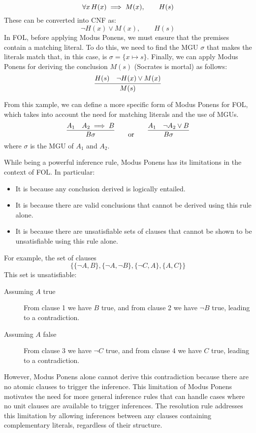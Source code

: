 \begin{equation}
  \forall x \, H(x) \implies M(x), \qquad H(s)
\end{equation}
These can be converted into CNF as:
\begin{equation}
    \neg H(x) \lor M(x), \qquad H(s)
\end{equation}
In FOL, before applying Modus Ponens, we must ensure that the premises contain a matching literal. To do this, we need to find the MGU \(\sigma\) that makes the literals match that, in this case, is \(\sigma = \{x\mapsto s\}\).
Finally, we can apply Modus Ponens for deriving the conclusion \(M(s)\) (Socrates is mortal) as follows:
\begin{equation}
  \infer{M(s)}{H(s) & \neg H(x) \lor M(x)}
\end{equation}

From this xample, we can define a more specific form of Modus Ponens for FOL, which takes into account the need for matching literals and the use of MGUs.
\begin{equation}  
  \infer{B\sigma}{A_1 & A_2 \implies B} \qquad \text{or} \qquad \infer{B\sigma}{A_1 & \neg A_2 \lor B}
\end{equation}
where \(\sigma\) is the MGU of \(A_1\) and \(A_2\).

While being a powerful inference rule, Modus Ponens has its limitations in the context of FOL\@.
In particular:
\begin{itemize}
  \item It is  because any conclusion derived is logically entailed.
  \item It is  because there are valid conclusions that cannot be derived using this rule alone.
  \item It is  because there are unsatisfiable sets of clauses that cannot be shown to be unsatisfiable using this rule alone.
\end{itemize}
For example, the set of clauses
\begin{equation}\label{eq:example_unsat}  
  \{\{\neg A, B\},\{\neg A , \neg B\}, \{\neg C , A\}, \{A , C\}\}
\end{equation}
This set is unsatisfiable:
\begin{description}
  \item[Assuming \(A\) true] From clause 1 we have \(B\) true, and from clause 2 we have \(\neg B\) true, leading to a contradiction.
  \item[Assuming \(A\) false] From clause 3 we have \(\neg C\) true, and from clause 4 we have \(C\) true, leading to a contradiction.
\end{description}
However, Modus Ponens alone cannot derive this contradiction because there are no atomic clauses to trigger the inference.
This limitation of Modus Ponens motivates the need for more general inference rules that can handle cases where no unit clauses are available to trigger inferences.
The resolution rule addresses this limitation by allowing inferences between any clauses containing complementary literals, regardless of their structure.

